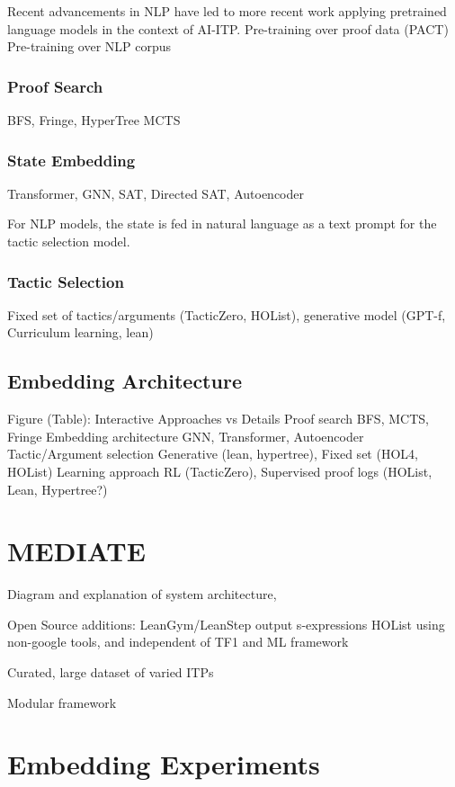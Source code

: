 \documentclass[letterpaper]{article} %
\begin{document}
    Recent advancements in NLP have led to more recent work applying pretrained language models in the context of AI-ITP.
    Pre-training over proof data (PACT)
    Pre-training over NLP corpus

    \subsubsection{Proof Search}
    BFS, Fringe, HyperTree MCTS

    \subsubsection{State Embedding}
    Transformer, GNN, SAT, Directed SAT, Autoencoder

    For NLP models, the state is fed in natural language as a text prompt for the tactic selection model.

    \subsubsection{Tactic Selection}
    Fixed set of tactics/arguments (TacticZero, HOList), generative model (GPT-f, Curriculum learning, lean)

    \subsection{Embedding Architecture}

    Figure (Table):
    Interactive Approaches vs Details
    Proof search
    BFS, MCTS, Fringe
    Embedding architecture
    GNN, Transformer, Autoencoder
    Tactic/Argument selection
    Generative (lean, hypertree), Fixed set (HOL4, HOList)
    Learning approach
    RL (TacticZero), Supervised proof logs (HOList, Lean, Hypertree?)


    \section{MEDIATE}
    Diagram and explanation of system architecture,

    Open Source additions:
    LeanGym/LeanStep output s-expressions
    HOList using non-google tools, and independent of TF1 and ML framework

    Curated, large dataset of varied ITPs

    Modular framework


    \section{Embedding Experiments}
\end{document}
